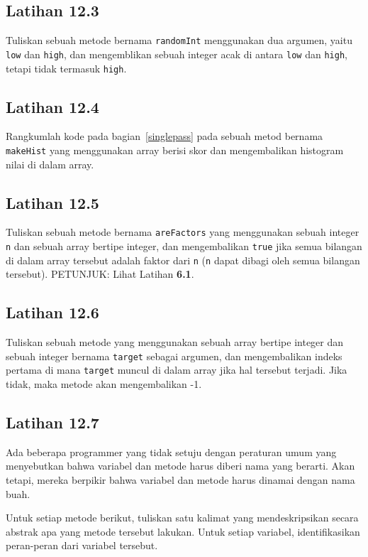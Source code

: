 \subsection{Latihan 12.3}
Tuliskan sebuah metode bernama {\tt randomInt} menggunakan dua argumen, yaitu
{\tt low} dan {\tt high}, dan mengemblikan sebuah integer acak di antara
{\tt low} dan {\tt high}, tetapi tidak termasuk {\tt high}.



\subsection{Latihan 12.4}
Rangkumlah kode pada bagian~\ref{singlepass} pada sebuah metod bernama
{\tt makeHist} yang menggunakan array berisi skor dan mengembalikan histogram nilai di dalam array.



\subsection{Latihan 12.5}
Tuliskan sebuah metode bernama {\tt areFactors} yang menggunakan sebuah integer {\tt n} dan sebuah array bertipe integer, dan mengembalikan
{\tt true} jika semua bilangan di dalam array tersebut adalah faktor dari {\tt n}
({\tt n} dapat dibagi oleh semua bilangan tersebut).
PETUNJUK: Lihat Latihan \textbf{6.1}.


\subsection{Latihan 12.6}
Tuliskan sebuah metode yang menggunakan sebuah array bertipe integer dan sebuah integer bernama
{\tt target} sebagai argumen, dan mengembalikan indeks pertama di mana
{\tt target} muncul di dalam array jika hal tersebut terjadi. Jika tidak, maka metode akan mengembalikan -1.


\subsection{Latihan 12.7}
Ada beberapa programmer yang tidak setuju dengan peraturan umum yang menyebutkan bahwa variabel dan metode harus diberi nama yang berarti. Akan tetapi, mereka berpikir bahwa variabel dan metode harus dinamai dengan nama buah.

Untuk setiap metode berikut, tuliskan satu kalimat yang mendeskripsikan secara abstrak apa yang metode tersebut lakukan. Untuk setiap variabel, identifikasikan peran-peran dari variabel tersebut.

